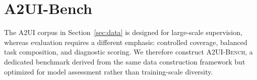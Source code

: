 








\section{A2UI-Bench}
\label{sec:benchmark}


The A2UI corpus in Section~\ref{sec:data} is designed for large-scale supervision, whereas evaluation requires a different emphasis: controlled coverage, balanced task composition, and diagnostic scoring. We therefore construct \textsc{A2UI-Bench}, a dedicated benchmark derived from the same data construction framework but optimized for model assessment rather than training-scale diversity.

